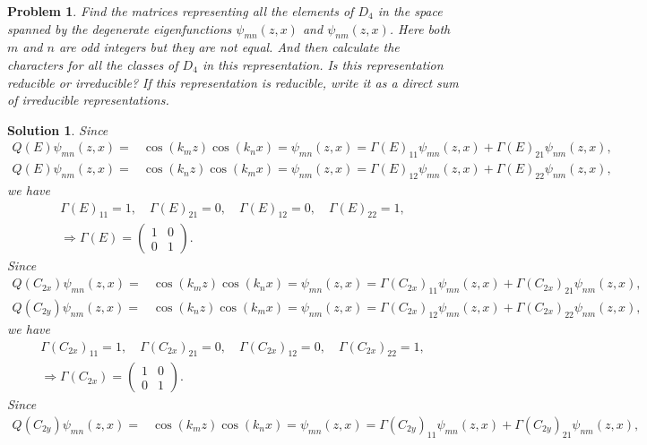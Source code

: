 \documentclass[UTF8,10pt,a4paper]{article}
\theoremstyle{Problem}
\newtheorem{prob}{Problem}
\theoremstyle{Solution}
\newtheorem*{sol}{Solution}
\begin{document}
\begin{prob}
    Find the matrices representing all the elements of $D_4$ in the space spanned by the degenerate eigenfunctions $\psi_{mn}(z,x)$ and $\psi_{nm}(z,x)$. Here both $m$ and $n$ are odd integers but they are not equal. And then calculate the characters for all the classes of $D_4$ in this representation. Is this representation reducible or irreducible? If this representation is reducible, write it as a direct sum of irreducible representations.
\end{prob}
\begin{sol}
    Since
    \begin{align}
        Q(E)\psi_{mn}(z,x)=&\cos(k_mz)\cos(k_nx)=\psi_{mn}(z,x)=\Gamma(E)_{11}\psi_{mn}(z,x)+\Gamma(E)_{21}\psi_{nm}(z,x),\\
        Q(E)\psi_{nm}(z,x)=&\cos(k_nz)\cos(k_mx)=\psi_{nm}(z,x)=\Gamma(E)_{12}\psi_{mn}(z,x)+\Gamma(E)_{22}\psi_{nm}(z,x),
    \end{align}
    we have
    \begin{gather}
        \Gamma(E)_{11}=1,\quad\Gamma(E)_{21}=0,\quad\Gamma(E)_{12}=0,\quad\Gamma(E)_{22}=1,\\
        \Longrightarrow\Gamma(E)=\left(\begin{matrix}
            1&0\\
            0&1
        \end{matrix}\right).
    \end{gather}
    Since
    \begin{align}
        Q(C_{2x})\psi_{mn}(z,x)=&\cos(k_mz)\cos(k_nx)=\psi_{mn}(z,x)=\Gamma(C_{2x})_{11}\psi_{mn}(z,x)+\Gamma(C_{2x})_{21}\psi_{nm}(z,x),\\
        Q(C_{2y})\psi_{nm}(z,x)=&\cos(k_nz)\cos(k_mx)=\psi_{nm}(z,x)=\Gamma(C_{2x})_{12}\psi_{mn}(z,x)+\Gamma(C_{2x})_{22}\psi_{nm}(z,x),
    \end{align}
    we have
    \begin{gather}
        \Gamma(C_{2x})_{11}=1,\quad\Gamma(C_{2x})_{21}=0,\quad\Gamma(C_{2x})_{12}=0,\quad\Gamma(C_{2x})_{22}=1,\\
        \Longrightarrow\Gamma(C_{2x})=\left(\begin{matrix}
            1&0\\
            0&1
        \end{matrix}\right).
    \end{gather}
    Since
    \begin{align}
        Q(C_{2y})\psi_{mn}(z,x)=&\cos(k_mz)\cos(k_nx)=\psi_{mn}(z,x)=\Gamma(C_{2y})_{11}\psi_{mn}(z,x)+\Gamma(C_{2y})_{21}\psi_{nm}(z,x),\\

\end{align}
\end{sol}
\end{document}
